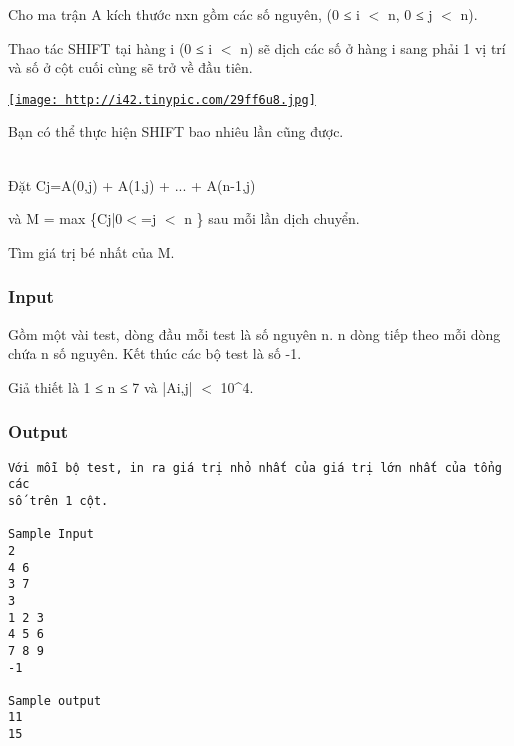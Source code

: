 

Cho ma trận A kích thước nxn gồm các số nguyên, (0 ≤ i $<$ n, 0 ≤ j $<$ n).

Thao tác SHIFT tại hàng i (0 ≤ i $<$ n) sẽ dịch các số ở hàng i sang phải 1 vị trí và số ở cột cuối cùng sẽ trở về đầu tiên.

\href{http://tinypic.com}{
\texttt{[image: http://i42.tinypic.com/29ff6u8.jpg]}}

Bạn có thể thực hiện SHIFT bao nhiêu lần cũng được.


\\Đặt Cj=A(0,j) + A(1,j) + ... + A(n-1,j)

và M = max \{Cj|0$<$=j $<$ n \} sau mỗi lần dịch chuyển.

Tìm giá trị bé nhất của M.

\subsubsection{Input}

Gồm một vài test, dòng đầu mỗi test là số nguyên n. n dòng tiếp theo mỗi dòng chứa n số nguyên. Kết thúc các bộ test là số -1.

Giả thiết là 1 ≤ n ≤ 7 và |Ai,j| $<$ 10\textasciicircum4.

\subsubsection{Output}
\begin{verbatim}
Với mỗi bộ test, in ra giá trị nhỏ nhất của giá trị lớn nhất của tổng các
số trên 1 cột.

​Sample Input
2
4 6
3 7
3
1 2 3
4 5 6
7 8 9
-1

Sample output
11
15\end{verbatim}